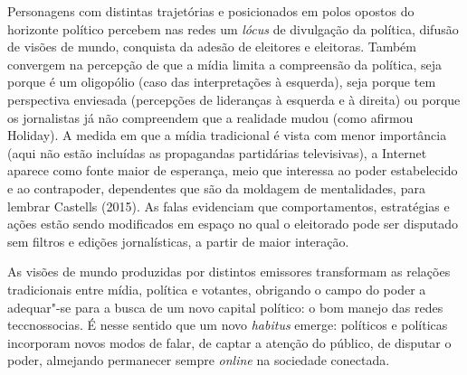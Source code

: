 Personagens com distintas trajetórias e posicionados em polos opostos do
horizonte político percebem nas redes um \textit{lócus} de divulgação da
política, difusão de visões de mundo, conquista da adesão de eleitores e
eleitoras. Também convergem na percepção de que a mídia limita a
compreensão da política, seja porque é um oligopólio (caso das
interpretações à esquerda), seja porque tem perspectiva enviesada
(percepções de lideranças à esquerda e à direita) ou porque os
jornalistas já não compreendem que a realidade mudou (como afirmou
Holiday). A medida em que a mídia tradicional é vista com menor
importância (aqui não estão incluídas as propagandas partidárias
televisivas), a Internet aparece como fonte maior de esperança, meio que
interessa ao poder estabelecido e ao contrapoder, dependentes que são da
moldagem de mentalidades, para lembrar Castells (2015). As falas
evidenciam que comportamentos, estratégias e ações estão sendo
modificados em espaço no qual o eleitorado pode ser disputado sem
filtros e edições jornalísticas, a partir de maior interação.

As visões de mundo produzidas por distintos emissores transformam as
relações tradicionais entre mídia, política e votantes, obrigando o
campo do poder a adequar"-se para a busca de um novo capital político: o
bom manejo das redes teccnossocias. É nesse sentido que um novo
\textit{habitus} emerge: políticos e políticas incorporam novos modos de
falar, de captar a atenção do público, de disputar o poder, almejando
permanecer sempre \textit{online} na sociedade conectada.


